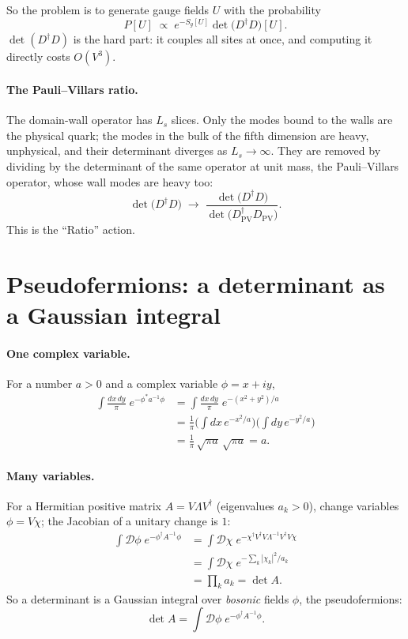 \documentclass[11pt,a4paper]{article}
\numberwithin{equation}{section}
\newcommand{\dg}{^{\dagger}}
\newcommand{\Dpv}{D_{\mathrm{PV}}}
\begin{document}
So the problem is to generate gauge fields $U$ with the probability
\begin{equation}
P[U]\;\propto\;e^{-S_g[U]}\det\!\big(D\dg D\big)[U] .
\end{equation}
$\det(D\dg D)$ is the hard part: it couples all sites at once, and computing it directly costs
$O(V^3)$.

\paragraph{The Pauli--Villars ratio.} The domain-wall operator has $L_s$ slices. Only the modes bound
to the walls are the physical quark; the modes in the bulk of the fifth dimension are heavy,
unphysical, and their determinant diverges as $L_s\to\infty$. They are removed by dividing by the
determinant of the same operator at unit mass, the Pauli--Villars operator, whose wall modes are
heavy too:
\begin{equation}
\det\!\big(D\dg D\big)\;\longrightarrow\;\frac{\det\!\big(D\dg D\big)}{\det\!\big(\Dpv\dg\Dpv\big)} .
\end{equation}
This is the ``Ratio'' action.

\section{Pseudofermions: a determinant as a Gaussian integral}
\paragraph{One complex variable.} For a number $a>0$ and a complex variable $\phi=x+iy$,
\begin{align}
\int\frac{dx\,dy}{\pi}\;e^{-\phi^*a^{-1}\phi}
&=\int\frac{dx\,dy}{\pi}\;e^{-(x^2+y^2)/a}\nonumber\\
&=\frac1\pi\Big(\int dx\,e^{-x^2/a}\Big)\Big(\int dy\,e^{-y^2/a}\Big)\nonumber\\
&=\frac1\pi\,\sqrt{\pi a}\,\sqrt{\pi a}=a .
\end{align}
\paragraph{Many variables.} For a Hermitian positive matrix $A=V\Lambda V\dg$ (eigenvalues
$a_k>0$), change variables $\phi=V\chi$; the Jacobian of a unitary change is $1$:
\begin{align}
\int\mathcal D\phi\;e^{-\phi\dg A^{-1}\phi}
&=\int\mathcal D\chi\;e^{-\chi\dg V\dg V\Lambda^{-1}V\dg V\chi}\nonumber\\
&=\int\mathcal D\chi\;e^{-\sum_k|\chi_k|^2/a_k}\nonumber\\
&=\prod_k a_k=\det A .
\end{align}
So a determinant is a Gaussian integral over \emph{bosonic} fields $\phi$, the pseudofermions:
\begin{equation}
\det A=\int\mathcal D\phi\;e^{-\phi\dg A^{-1}\phi} .
\end{equation}
\end{document}
